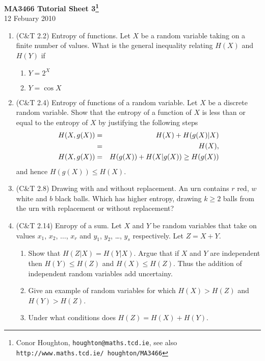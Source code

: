 \documentclass[12pt]{article}
\begin{document}
\begin{center}
{\bf MA3466 Tutorial Sheet 3\footnote{Conor Houghton, {\tt houghton@maths.tcd.ie}, see also {\tt http://www.maths.tcd.ie/ houghton/MA3466}}}\\[1cm]{} 12 Febuary 2010
\end{center}
\begin{enumerate}

\item (C\&T 2.2) Entropy of functions. Let $X$ be a random variable taking on a finite number of values. What is the general inequality relating $H(X)$ and $H(Y)$ if 
\begin{enumerate}
\item $Y=2^X$
\item $Y=\cos{X}$
\end{enumerate}

\item (C\&T 2.4) Entropy of functions of a random variable. Let $X$ be a discrete random variable. Show that the entropy of a function of $X$ is less than or equal to the entropy of $X$ by justifying the following steps
\begin{eqnarray}
H(X,g(X))&=&H(X)+H(g(X)|X)\cr
         &=&H(X),\cr
H(X,g(X))&=&H(g(X))+H(X|g(X))\ge H(g(X))
\end{eqnarray}
and hence $H(g(X))\le H(X)$.

\item (C\&T 2.8) Drawing with and without replacement. An urn contains
$r$ red, $w$ white and $b$ black balls. Which has higher entropy,
drawing $k\ge 2$ balls from the urn with replacement or without
replacement?

\item (C\&T 2.14) Enropy of a sum. Let $X$ and $Y$ be random variables that take on values $x_1$, $x_2$, $\ldots$, $x_r$ and $y_1$, $y_2$, \ldots, $y_s$ respectively. Let $Z=X+Y$.
\begin{enumerate}
\item Show that $H(Z|X)=H(Y|X)$. Argue that if $X$ and $Y$ are independent then $H(Y)\le H(Z)$ and $H(X)\le H(Z)$. Thus the addition of independent random variables add uncertainy.
\item Give an example of random variables for which $H(X)>H(Z)$ and $H(Y)>H(Z)$.
\item Under what conditions does $H(Z)=H(X)+H(Y)$.
\end{enumerate}


\end{enumerate}
\end{document}
